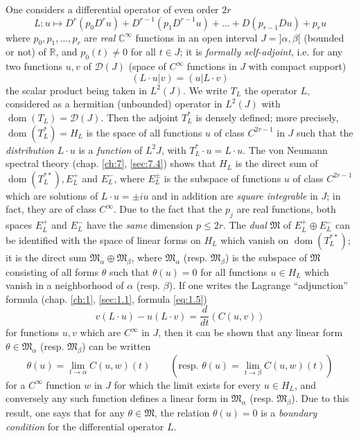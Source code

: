 \documentclass[12pt,a4paper,leqno,twoside]{extbook}
\newcommand{\C}{\mathbb{C}}
\newcommand{\R}{\mathbb{R}}
\newcommand{\dom}{\operatorname{dom}}
\begin{document}
One considers a differential operator of even order \(2r\)
\begin{equation}
    \label{eq:9.15}
    L: u \mapsto D^r(p_0 D^r u) + D^{r-1}(p_1 D^{r-1}u) + \ldots + D(p_{r-1}Du) + p_r u
\end{equation}
where \(p_0, p_1, \ldots, p_r\) are \emph{real} \(\C^\infty\) functions in an open interval \(J = ]\alpha, \beta[\) (bounded or not) of \(\R\), and \(p_0(t) \neq 0\) for all \(t \in J\); it is \emph{formally self-adjoint}, i.e. for any two functions \(u, v\) of \(\mathcal{D}(J)\) (space of \(C^\infty\) functions in \(J\) with compact support)
\begin{equation}
    \label{eq:9.16}
    (L \cdot u | v) = (u | L \cdot v)
\end{equation}
the scalar product being taken in \(L^2(J)\). We write \(T_L\) the operator \(L\), considered as a hermitian (unbounded) operator in \(L^2(J)\) with \(\dom(T_L) = \mathcal{D}(J)\). Then the adjoint \(T^*_L\) is densely defined; more precisely, \(\dom(T^*_L) = H_L\) is the space of all functions \(u\) of class \(C^{2r-1}\) in \(J\) such that the \emph{distribution} \(L \cdot u\) is a \emph{function} of \(L^2{J}\), with \(T^*_L \cdot u = L \cdot u\). The von Neumann spectral theory (chap. \ref{ch:7}, \ref{sec:7.4}) shows that \(H_L\) is the direct sum of \(\dom(T^{**}_L), E^+_L\) and \(E^-_L\), where \(E^\pm_L\) is the subspace of functions \(u\) of class \(C^{2r-1}\) which are solutions of \(L \cdot u = \pm iu\) and in addition are \emph{square integrable} in \(J\); in fact, they are of class \(C^\infty\). Due to the fact that the \(p_j\) are real functions, both spaces \(E^+_L\) and \(E^-_L\) have the \emph{same} dimension \(p \leq 2r\). The \emph{dual} \(\mathfrak{M}\) of \(E^+_L \oplus E^-_L\) can be identified with the space of linear forms on \(H_L\) which vanish on \(\dom(T^{**}_L)\); it is the direct sum \(\mathfrak{M}_\alpha \oplus \mathfrak{M}_\beta\), where \(\mathfrak{M}_\alpha\) (resp. \(\mathfrak{M}_\beta\)) is the subspace of \(\mathfrak{M}\) consisting of all forms \(\theta\) such that \(\theta(u) = 0\) for all functions \(u \in H_L\) which vanish in a neighborhood of \(\alpha\) (resp. \(\beta\)). If one writes the Lagrange ``adjunction'' formula (chap. \ref{ch:1}, \ref{sec:1.1}, formula \eqref{eq:1.5})
\[
    v(L \cdot u) - u(L \cdot v) = \frac{d}{dt}(C(u,v))
\]
for functions \(u, v\) which are \(C^\infty\) in \(J\), then it can be shown that any linear form \(\theta \in \mathfrak{M}_\alpha\) (resp. \(\mathfrak{M}_\beta\)) can be written
\[
    \theta(u) = \lim_{t \to \alpha} C(u,w)(t)
    \qquad
    (\text{resp. } \theta(u) = \lim_{t \to \beta} C(u,w)(t))
\]
for a \(C^\infty\) function \(w\) in \(J\) for which the limit exists for every \(u \in H_L\), and conversely any such function defines a linear form in \(\mathfrak{M}_\alpha\) (resp. \(\mathfrak{M}_\beta\)). Due to this result, one says that for any \(\theta \in \mathfrak{M}\), the relation \(\theta(u) = 0\) is a \emph{boundary condition} for the differential operator \(L\).
\end{document}
